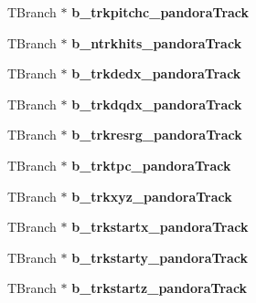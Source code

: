 \begin{DoxyCompactItemize}
\item 
\hypertarget{classanatree_a8f41f7a2c36e4ffd56830daab869a2e9}{T\-Branch $\ast$ {\bfseries b\-\_\-trkpitchc\-\_\-pandora\-Track}}\label{classanatree_a8f41f7a2c36e4ffd56830daab869a2e9}

\item 
\hypertarget{classanatree_aa233fe3244e43fa21f61ff0d5eb366ba}{T\-Branch $\ast$ {\bfseries b\-\_\-ntrkhits\-\_\-pandora\-Track}}\label{classanatree_aa233fe3244e43fa21f61ff0d5eb366ba}

\item 
\hypertarget{classanatree_a7602085679da71b3a746aef20d82f983}{T\-Branch $\ast$ {\bfseries b\-\_\-trkdedx\-\_\-pandora\-Track}}\label{classanatree_a7602085679da71b3a746aef20d82f983}

\item 
\hypertarget{classanatree_abe95194f0f763762a0748e568c2e9402}{T\-Branch $\ast$ {\bfseries b\-\_\-trkdqdx\-\_\-pandora\-Track}}\label{classanatree_abe95194f0f763762a0748e568c2e9402}

\item 
\hypertarget{classanatree_a269b03fc1d1c98f519cf86eee5ebaa7c}{T\-Branch $\ast$ {\bfseries b\-\_\-trkresrg\-\_\-pandora\-Track}}\label{classanatree_a269b03fc1d1c98f519cf86eee5ebaa7c}

\item 
\hypertarget{classanatree_a83931160f7d55dc1729d19d5596c08fb}{T\-Branch $\ast$ {\bfseries b\-\_\-trktpc\-\_\-pandora\-Track}}\label{classanatree_a83931160f7d55dc1729d19d5596c08fb}

\item 
\hypertarget{classanatree_a98b79dd72d2573cba9d87a9daae04561}{T\-Branch $\ast$ {\bfseries b\-\_\-trkxyz\-\_\-pandora\-Track}}\label{classanatree_a98b79dd72d2573cba9d87a9daae04561}

\item 
\hypertarget{classanatree_ad3eb8dbe08bba1dc6c62ea7f0ecef222}{T\-Branch $\ast$ {\bfseries b\-\_\-trkstartx\-\_\-pandora\-Track}}\label{classanatree_ad3eb8dbe08bba1dc6c62ea7f0ecef222}

\item 
\hypertarget{classanatree_a19283815da2847fee1d49872e9dd0a60}{T\-Branch $\ast$ {\bfseries b\-\_\-trkstarty\-\_\-pandora\-Track}}\label{classanatree_a19283815da2847fee1d49872e9dd0a60}

\item 
\hypertarget{classanatree_a1ba553abb98927982dac4b2f316971d3}{T\-Branch $\ast$ {\bfseries b\-\_\-trkstartz\-\_\-pandora\-Track}}\label{classanatree_a1ba553abb98927982dac4b2f316971d3}


\end{DoxyCompactItemize}
